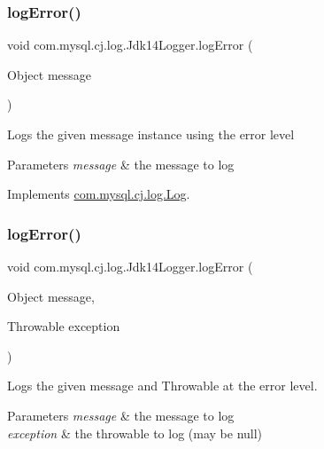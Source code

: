 \subsubsection{\texorpdfstring{log\+Error()}{logError()}\hspace{0.1cm}{\footnotesize\ttfamily [1/2]}}
{\footnotesize\ttfamily void com.\+mysql.\+cj.\+log.\+Jdk14\+Logger.\+log\+Error (\begin{DoxyParamCaption}\item[{Object}]{message }\end{DoxyParamCaption})}

Logs the given message instance using the \textquotesingle{}error\textquotesingle{} level


\begin{DoxyParams}{Parameters}
{\em message} & the message to log \\
\hline
\end{DoxyParams}


Implements \mbox{\hyperlink{interfacecom_1_1mysql_1_1cj_1_1log_1_1_log_ab6f35d1efab89f0c0316106fa4a15d2c}{com.\+mysql.\+cj.\+log.\+Log}}.

\mbox{\label{classcom_1_1mysql_1_1cj_1_1log_1_1_jdk14_logger_ada15522843be28970a27cfb2892147d0}} 
\subsubsection{\texorpdfstring{log\+Error()}{logError()}\hspace{0.1cm}{\footnotesize\ttfamily [2/2]}}
{\footnotesize\ttfamily void com.\+mysql.\+cj.\+log.\+Jdk14\+Logger.\+log\+Error (\begin{DoxyParamCaption}\item[{Object}]{message,  }\item[{Throwable}]{exception }\end{DoxyParamCaption})}

Logs the given message and Throwable at the \textquotesingle{}error\textquotesingle{} level.


\begin{DoxyParams}{Parameters}
{\em message} & the message to log \\
\hline
{\em exception} & the throwable to log (may be null) \\
\hline
\end{DoxyParams}


